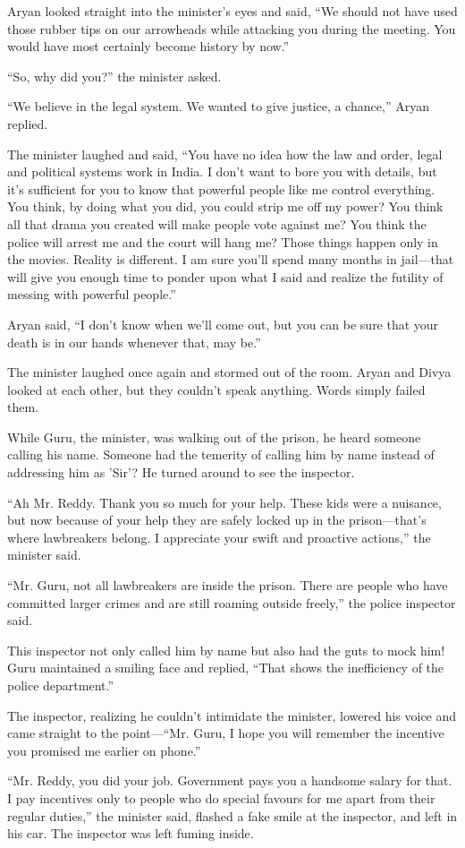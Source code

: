 Aryan looked straight into the minister's eyes and said, “We should not have
used those rubber tips on our arrowheads while attacking you during the meeting.
You would have most certainly become history by now.”

“So, why did you?” the minister asked.

“We believe in the legal system. We wanted to give justice, a chance,” Aryan
replied.

The minister laughed and said, “You have no idea how the law and order, legal
and political systems work in India. I don't want to bore you with details, but
it's sufficient for you to know that powerful people like me control everything.
You think, by doing what you did, you could strip me off my power? You think all
that drama you created will make people vote against me? You think the police
will arrest me and the court will hang me? Those things happen only in the
movies. Reality is different. I am sure you'll spend many months in jail—that
will give you enough time to ponder upon what I said and realize the futility of
messing with powerful people.”

Aryan said, “I don't know when we'll come out, but you can be sure that your
death is in our hands whenever that, may be.”

The minister laughed once again and stormed out of the room. Aryan and Divya
looked at each other, but they couldn't speak anything. Words simply failed them.

While Guru, the minister, was walking out of the prison, he heard someone
calling his name. Someone had the temerity of calling him by name instead of
addressing him as 'Sir'? He turned around to see the inspector.

“Ah Mr. Reddy. Thank you so much for your help. These kids were a nuisance, but
now because of your help they are safely locked up in the prison—that's where
lawbreakers belong. I appreciate your swift and proactive actions,” the
minister said.

“Mr. Guru, not all lawbreakers are inside the prison. There are people who have
committed larger crimes and are still roaming outside freely,” the police
inspector said.

This inspector not only called him by name but also had the guts to mock him!
Guru maintained a smiling face and replied, “That shows the inefficiency of the
police department.”

The inspector, realizing he couldn't intimidate the minister, lowered his voice
and came straight to the point—“Mr. Guru, I hope you will remember the
incentive you promised me earlier on phone.”

“Mr. Reddy, you did your job. Government pays you a handsome salary for that. I
pay incentives only to people who do special favours for me apart from their
regular duties,” the minister said, flashed a fake smile at the inspector, and
left in his car. The inspector was left fuming inside.